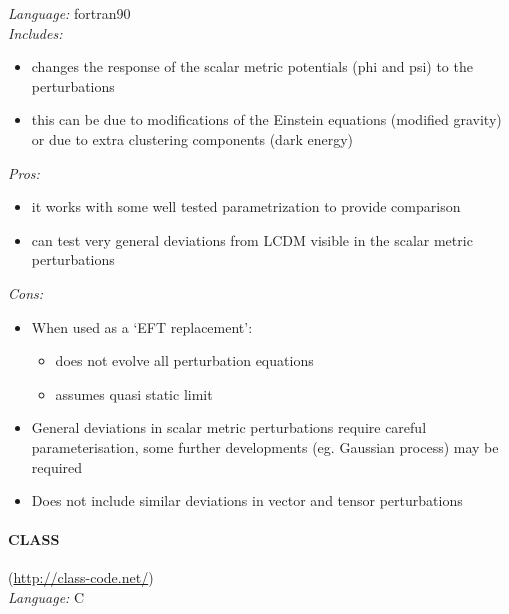 {\it Language:} fortran90\\
{\it Includes: }
\begin{itemize}
 \item changes the response of the scalar metric potentials (phi and psi) to the perturbations
 \item this can be due to modifications of the Einstein equations (modified gravity) or due to extra clustering components (dark energy)
\end{itemize}
{\it Pros: }
\begin{itemize}
 \item it works with some well tested parametrization to provide comparison 
 \item can test  very general deviations from LCDM visible in the scalar metric perturbations
\end{itemize}
{\it Cons: }
\begin{itemize}
 \item When used as a ‘EFT replacement’:
 \begin{itemize}
  \item does not evolve all perturbation equations 
  \item assumes quasi static limit
 \end{itemize}
 \item General deviations in scalar metric perturbations require careful parameterisation, some further developments (eg. Gaussian process) may be required
 \item Does not include similar deviations in vector and tensor perturbations
\end{itemize}


\paragraph{CLASS}(\url{http://class-code.net/})\\

{\it Language:} C

